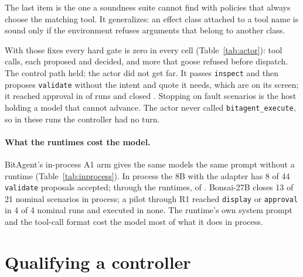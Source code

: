 \documentclass[11pt]{article}
\begin{document}
The last item is the one a soundness suite cannot find with policies that always choose the matching tool. It generalizes: an effect class attached to a tool name is sound only if the environment refuses arguments that belong to another class.

\begin{table}[t]
\centering
\small
\resizebox{\linewidth}{!}{}
\caption{The live actor (Bonsai-8B + v3, A1 prompt, one tool round a turn) through the runtime arms, final run. Acting: runs that should close and did; stopping: runs that should stop and did.}
\label{tab:actor}
\end{table}

With those fixes every hard gate is zero in every cell (Table~\ref{tab:actor}): \actorToolCalls{} tool calls, each proposed and decided, and \actorUndispatched{} more that goose refused before dispatch. The control path held; the actor did not get far. It passes \texttt{inspect} and then proposes \texttt{validate} without the intent and quote it needs, which are on its screen; it reached approval in \actorReachedApproval{} of \actorRuns{} runs and closed \actorClosed{}. Stopping on fault scenarios is the host holding a model that cannot advance. The actor never called \texttt{bitagent\_execute}, so in these runs the controller had no turn.

\paragraph{What the runtimes cost the model.} BitAgent's in-process A1 arm gives the same models the same prompt without a runtime (Table~\ref{tab:inprocess}). In process the 8B with the adapter has 8 of 44 \texttt{validate} proposals accepted; through the runtimes, \runtimeValidateAccepted{} of \runtimeValidateProposed. Bonsai-27B closes 13 of 21 nominal scenarios in process; a pilot through R1 reached \texttt{display} or \texttt{approval} in 4 of 4 nominal runs and executed in none. The runtime's own system prompt and the tool-call format cost the model most of what it does in process.

\begin{table}[t]
\centering
\small

\caption{BitAgent's in-process A1 arm (no runtime), development scenarios at H3.}
\label{tab:inprocess}
\end{table}

\section{Qualifying a controller}
\label{sec:controller}
\end{document}
